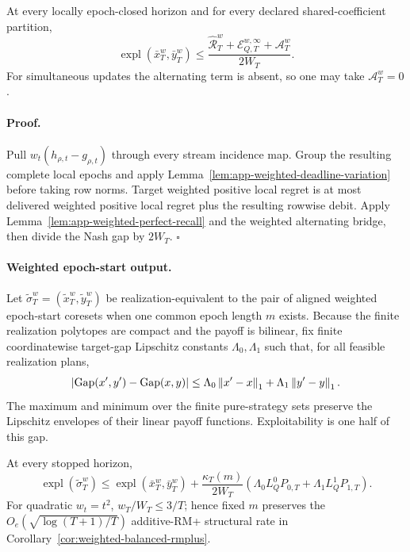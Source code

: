 \begin{theorem}
\label{thm:app-weighted-component-certificate}
At every locally epoch-closed horizon and for every declared
shared-coefficient partition,
\begin{equation}
\operatorname{expl}(\bar x_T^w,\bar y_T^w)
\le
\frac{\widehat{\mathcal R}_T^w
+\mathcal E_{Q,T}^{w,\infty}+\mathcal A_T^w}{2W_T}.
\label{eq:app-weighted-component-certificate}
\end{equation}
For simultaneous updates the alternating term is absent, so one may take
$\mathcal A_T^w=0$.
\end{theorem}

\paragraph{Proof.}
Pull $w_t(h_{\rho,t}-g_{\rho,t})$ through every stream incidence map.  Group
the resulting complete local epochs and apply
Lemma~\ref{lem:app-weighted-deadline-variation} before taking row norms.
Target weighted positive local regret is at most delivered weighted positive
local regret plus the resulting rowwise debit.  Apply
Lemma~\ref{lem:app-weighted-perfect-recall} and the weighted alternating
bridge, then divide the Nash gap by $2W_T$. \hfill$\square$

\paragraph{Weighted epoch-start output.}
Let $\widetilde\sigma_T^w=(\widetilde x_T^w,\widetilde y_T^w)$ be
realization-equivalent to the pair of aligned weighted epoch-start coresets
when one common epoch length $m$ exists.
Because the finite realization polytopes are compact and the payoff is
bilinear, fix finite coordinatewise target-gap Lipschitz constants
$\Lambda_0,\Lambda_1$ such that, for all feasible realization plans,
\begin{equation}
\left|\operatorname{Gap}(x',y')-\operatorname{Gap}(x,y)\right|
\le \Lambda_0\left\lVert x'-x \right\rVert_1+\Lambda_1\left\lVert y'-y \right\rVert_1.
\label{eq:app-target-gap-lipschitz}
\end{equation}
The maximum and minimum over the finite pure-strategy sets preserve the
Lipschitz envelopes of their linear payoff functions.  Exploitability is
one half of this gap.

\begin{corollary}
\label{cor:app-epoch-start}
At every stopped horizon,
\begin{equation}
\operatorname{expl}(\widetilde\sigma_T^w)
\le\operatorname{expl}(\bar x_T^w,\bar y_T^w)
+\frac{\kappa_T(m)}{2W_T}
(\Lambda_0L_Q^0P_{0,T}+\Lambda_1L_Q^1P_{1,T}).
\label{eq:app-epoch-start-bound}
\end{equation}
For quadratic $w_t=t^2$, $w_T/W_T\le3/T$; hence fixed $m$ preserves the
$O_e(\sqrt{\log(T+1)/T})$ additive-RM+ structural rate in
Corollary~\ref{cor:weighted-balanced-rmplus}.
\end{corollary}

